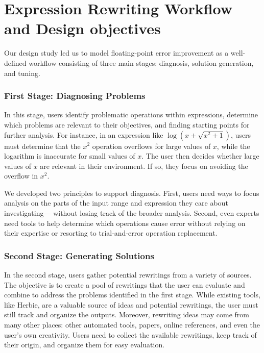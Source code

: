 
\section{Expression Rewriting Workflow and Design objectives}

Our design study %
  led us to model floating-point error improvement
  as a well-defined workflow consisting of three main stages:
  diagnosis, solution generation, and tuning.



\subsubsection*{First Stage: Diagnosing Problems}

In this stage, users identify problematic operations within expressions,
  determine which problems are relevant to their objectives,
  and finding starting points for further analysis.
For instance, in an expression like $\log(x + \sqrt{x^2 + 1})$,
  users must determine that
  the $x^2$ operation overflows for large values of $x$,
  while the logarithm is inaccurate for small values of $x$.
The user then decides whether
  large values of $x$ are relevant in their environment.
  If so, they focus on avoiding the overflow in $x^2$.

We developed two principles to support diagnosis.
First, users need ways to focus analysis
  on the parts of the input range and expression
  they care about investigating---%
  without losing track of the broader analysis.
Second, even experts %
  need tools to help determine which operations cause error
  without relying on their expertise
  or resorting to trial-and-error operation replacement.

\subsubsection*{Second Stage: Generating Solutions}

In the second stage,
  users gather potential rewritings from a variety of sources.
The objective is to create a pool of rewritings
  that the user can evaluate and combine
  to address the problems identified in the first stage.
While existing tools, like Herbie,
  are a valuable source of ideas and potential rewritings,
  the user must still track and organize the outputs.
Moreover, rewriting ideas may come from many other places:
  other automated tools, papers, online references,
  and even the user's own creativity.
Users need to collect the available rewritings,
  keep track of their origin,
  and organize them for easy evaluation.

